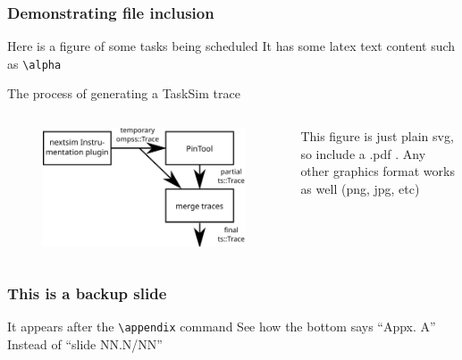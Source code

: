 \documentclass[c,12pt]{beamer}
\begin{document}
\begin{frame}[fragile]
	\frametitle{Demonstrating file inclusion}
	\begin{block}{Here is a figure of some tasks being scheduled}
		It has some latex text content such as \verb|\alpha|
		\begin{figure}[h!]
		\centering
		\tiny %
		
		\end{figure}
	\end{block}
	\vspace{-1em}\pause
	\begin{block}{The process of generating a TaskSim trace}
		\begin{columns}
		\begin{column}{0.3\linewidth}
			\begin{figure}[h!]
			\centering
			\includegraphics[width=\linewidth]{tracing_architecture}
			\end{figure}
		\end{column}
		\begin{column}{0.5\linewidth}
			This figure is just plain svg, so include a .pdf . Any other graphics format works as well (png, jpg, etc)
		\end{column}
		\end{columns}
	\end{block}
\end{frame}


\appendix

\begin{frame}
	\frametitle{This is a backup slide}
	\begin{block}{It appears after the \texttt{\textbackslash appendix} command}
		See how the bottom says ``Appx. A'' Instead of ``slide NN.N/NN''
	\end{block}
\end{frame}
\end{document}
